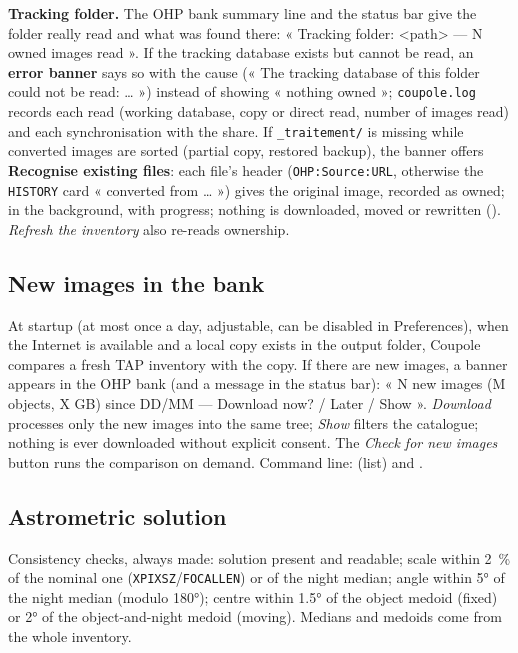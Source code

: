 \textbf{Tracking folder.} The OHP bank summary line and the status bar give the folder really read and what was
found there: « Tracking folder: <path> --- N owned images read ». If the tracking database exists but cannot be
read, an \textbf{error banner} says so with the cause (« The tracking database of this folder could not be read: … »)
instead of showing « nothing owned »; \texttt{coupole.log} records each read (working database, copy or direct
read, number of images read) and each synchronisation with the share. If \texttt{\_traitement/} is missing while
converted images are sorted (partial copy, restored backup), the banner offers \textbf{Recognise existing files}:
each file's header (\texttt{OHP:Source:URL}, otherwise the \texttt{HISTORY} card « converted from … ») gives the
original image, recorded as owned; in the background, with progress; nothing is downloaded, moved or rewritten
(). \emph{Refresh the inventory} also re-reads ownership.

\subsection{New images in the bank}\label{sec:nouveautes}
At startup (at most once a day, adjustable, can be disabled in Preferences), when the Internet is available and a
local copy exists in the output folder, Coupole compares a fresh TAP inventory with the copy. If there are new images,
a banner appears in the OHP bank (and a message in the status bar): « N new images (M objects, X GB) since DD/MM ---
Download now? / Later / Show ». \emph{Download} processes only the new images into the same tree; \emph{Show}
filters the catalogue; nothing is ever downloaded without explicit consent. The \emph{Check for new images} button
runs the comparison on demand. Command line:  (list) and .

\subsection{Astrometric solution}\label{sec:astrometrie}
Consistency checks, always made: solution present and readable; scale within 2~\% of the nominal one
(\texttt{XPIXSZ}/\texttt{FOCALLEN}) or of the night median; angle within 5° of the night median (modulo 180°);
centre within 1.5° of the object medoid (fixed) or 2° of the object-and-night medoid (moving). Medians and medoids
come from the whole inventory.

